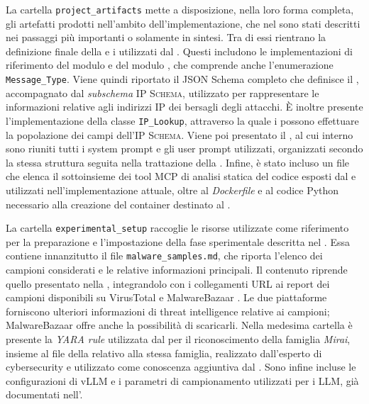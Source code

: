 La cartella \texttt{project\_artifacts} mette a disposizione, nella loro forma completa, gli artefatti prodotti nell'ambito dell'implementazione, che nel  sono stati descritti nei passaggi più importanti o solamente in sintesi. Tra di essi rientrano la definizione finale della \interface{} e i \templates{} utilizzati dal \codeagent{}. Questi includono le implementazioni di riferimento del modulo \botnet{} e del modulo \parser{}, che comprende anche l'enumerazione \texttt{Message\_Type}. Viene quindi riportato il JSON Schema completo che definisce il \schema{}, accompagnato dal \emph{subschema} \textsc{IP Schema}, utilizzato per rappresentare le informazioni relative agli indirizzi IP dei bersagli degli attacchi. È inoltre presente l'implementazione della classe \texttt{IP\_Lookup}, attraverso la quale i \capture{} possono effettuare la popolazione dei campi dell'\textsc{IP Schema}. Viene poi presentato il \prompt{}, al cui interno sono riuniti tutti i system prompt e gli user prompt utilizzati, organizzati secondo la stessa struttura seguita nella trattazione della . Infine, è stato incluso un file che elenca il sottoinsieme dei tool MCP di analisi statica del codice esposti dal \sreframework{} e utilizzati nell'implementazione attuale, oltre al \emph{Dockerfile} e al codice Python necessario alla creazione del container destinato al \sandbox{}.


La cartella \texttt{experimental\_setup} raccoglie le risorse utilizzate come riferimento per la preparazione e l'impostazione della fase sperimentale descritta nel . Essa contiene innanzitutto il file \texttt{malware\_samples.md}, che riporta l'elenco dei campioni considerati e le relative informazioni principali. Il contenuto riprende quello presentato nella , integrandolo con i collegamenti URL ai report dei campioni disponibili su VirusTotal \cite{virustotal2026vt} e MalwareBazaar \cite{malwarebazaar2026browse}. Le due piattaforme forniscono ulteriori informazioni di threat intelligence relative ai campioni; MalwareBazaar offre anche la possibilità di scaricarli. Nella medesima cartella è presente la \emph{YARA rule} utilizzata dal \classifier{} per il riconoscimento della famiglia \emph{Mirai}, insieme al file della \kb{} relativo alla stessa famiglia, realizzato dall'esperto di cybersecurity e utilizzato come conoscenza aggiuntiva dal \sreagent{}. Sono infine incluse le configurazioni di vLLM e i parametri di campionamento utilizzati per i LLM, già documentati nell'.

